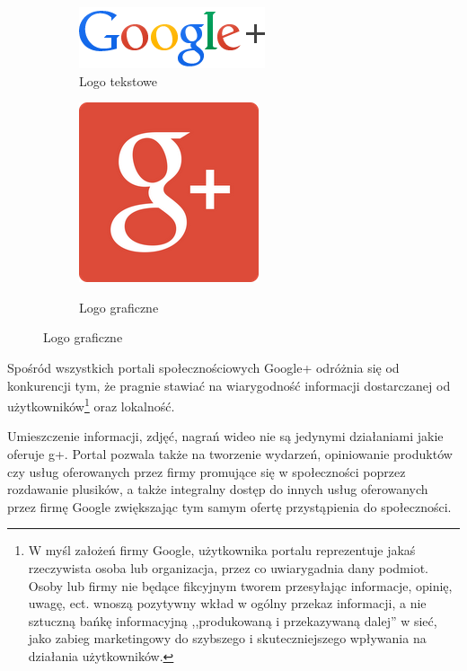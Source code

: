 \begin{figure}[!h]
\centering
\begin{subfigure}{.5\textwidth}
  \centering
  \includegraphics[width=.4\linewidth]{images/googleplus_color.png}
  \caption{Logo tekstowe}
  \label{fig:sub1}
\end{subfigure}%
\begin{subfigure}{.5\textwidth}
  \centering
  \scalebox{0.7}
  {
      \includegraphics[width=.4\linewidth]{images/google-plus-logo.png}
  }  
  \caption{Logo graficzne}
  \label{fig:sub2}
\end{subfigure}
\label{fig:logo-google}
\end{figure}

Spośród wszystkich portali społecznościowych Google+ odróżnia się od konkurencji tym, że pragnie stawiać na wiarygodność informacji dostarczanej od użytkowników\footnote{W myśl założeń firmy Google, użytkownika portalu reprezentuje jakaś rzeczywista osoba lub organizacja, przez co uwiarygadnia dany podmiot. Osoby lub firmy nie będące fikcyjnym tworem przesyłając informacje, opinię, uwagę, ect. wnoszą pozytywny wkład w ogólny przekaz informacji, a nie sztuczną bańkę informacyjną ,,produkowaną i przekazywaną dalej'' w sieć, jako zabieg marketingowy do szybszego i skuteczniejszego wpływania na działania użytkowników.} oraz lokalność.

Umieszczenie informacji, zdjęć, nagrań wideo nie są jedynymi działaniami jakie oferuje g+. Portal pozwala także na tworzenie wydarzeń, opiniowanie produktów czy usług oferowanych przez firmy promujące się w społeczności poprzez rozdawanie plusików, a także integralny dostęp do innych usług oferowanych przez firmę Google zwiększając tym samym ofertę przystąpienia do społeczności.

